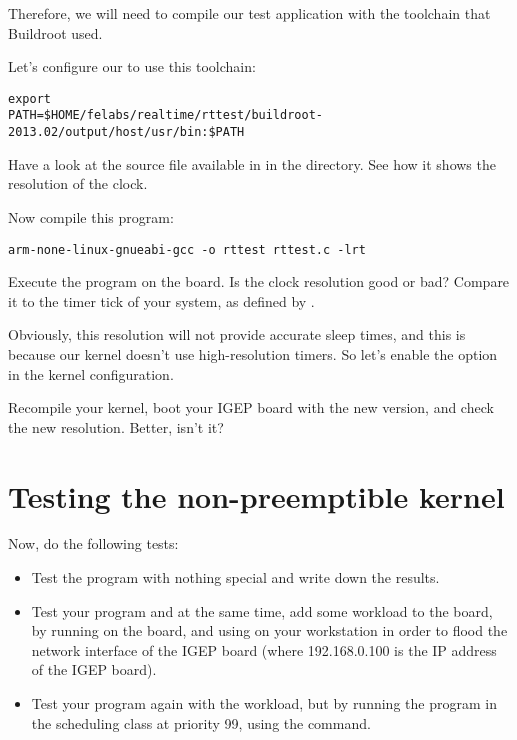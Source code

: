 Therefore, we will need to compile our test application with the
toolchain that Buildroot used.

Let's configure our  to use this toolchain:

\begin{verbatim}
export
PATH=$HOME/felabs/realtime/rttest/buildroot-2013.02/output/host/usr/bin:$PATH
\end{verbatim}

Have a look at the  source file available in  in
the  directory. See how it shows the resolution of the
 clock.

Now compile this program:
\begin{verbatim}
arm-none-linux-gnueabi-gcc -o rttest rttest.c -lrt
\end{verbatim}

Execute the program on the board. Is the clock resolution good or bad?
Compare it to the timer tick of your system, as defined by .

Obviously, this resolution will not provide accurate sleep times, and
this is because our kernel doesn't use high-resolution timers. So
let's enable the  option in the kernel
configuration.

Recompile your kernel, boot your IGEP board with the new version, and
check the new resolution. Better, isn't it?

\section{Testing the non-preemptible kernel}

Now, do the following tests:
\begin{itemize}
\item Test the program with nothing special and write down the
  results.
\item Test your program and at the same time, add some workload to the
  board, by running  on the
  board, and using  on your
  workstation in order to flood the network interface of the IGEP
  board (where 192.168.0.100 is the IP address of the IGEP board).
\item Test your program again with the workload, but by running the
  program in the  scheduling class at priority 99,
  using the  command.
\end{itemize}

